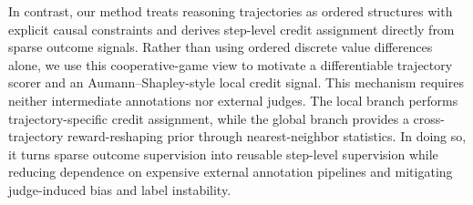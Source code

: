 In contrast, our method treats reasoning trajectories as ordered structures with
explicit causal constraints and derives step-level credit assignment directly
from sparse outcome signals.
Rather than using ordered discrete value differences alone, we use this
cooperative-game view to motivate a differentiable trajectory scorer and an
Aumann--Shapley-style local credit signal.
This mechanism requires neither intermediate annotations nor external judges.
The local branch performs trajectory-specific credit assignment, while the
global branch provides a cross-trajectory reward-reshaping prior through
nearest-neighbor statistics.
In doing so, it turns sparse outcome supervision into reusable step-level
supervision while reducing dependence on expensive external annotation
pipelines and mitigating judge-induced bias and label instability.
